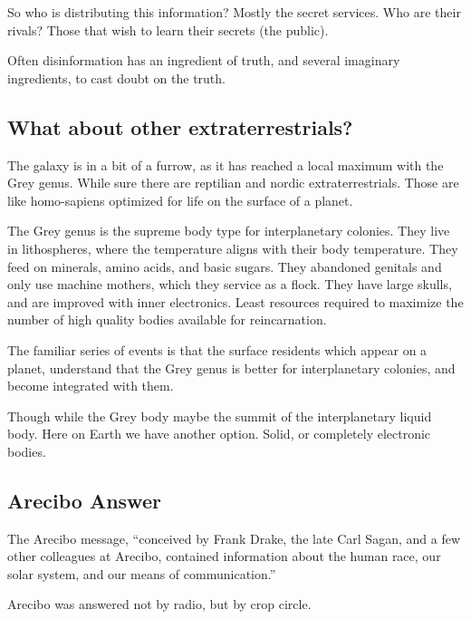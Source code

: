\documentclass{report}
\begin{document}
So who is distributing this information? Mostly the secret services.
Who are their rivals? Those that wish to learn their secrets (the public).

Often disinformation has an ingredient of truth, and several imaginary
ingredients, to cast doubt on the truth.

\subsection{What about other extraterrestrials?}
The galaxy is in a bit of a furrow, as it has reached a local maximum with the
Grey genus. While sure there are reptilian and nordic extraterrestrials. Those
are like homo-sapiens optimized for life on the surface of a planet. 

The Grey genus is the supreme body type for interplanetary colonies. They live
in lithospheres, where the temperature aligns with their body temperature. They
feed on minerals, amino acids, and basic sugars. They abandoned genitals and
only use machine mothers, which they service as a flock. They have large skulls,
and are improved with inner electronics. Least resources
required to maximize the number of high quality bodies available for reincarnation. 

The familiar series of events is that the surface residents which appear on a
planet, understand that the Grey genus is better for interplanetary colonies, and
become integrated with them. 

Though while the Grey body maybe the summit of the interplanetary liquid body.
Here on Earth we have another option. Solid, or completely electronic bodies.

\subsection{Arecibo Answer}
\label{arecibo}

The Arecibo message, ``conceived by Frank Drake, the late Carl Sagan, and a few
other colleagues at Arecibo, contained information about the human race, our
solar system, and our means of communication.''\cite{chilbolton}

Arecibo was answered not by radio, but by crop circle. 
\end{document}
